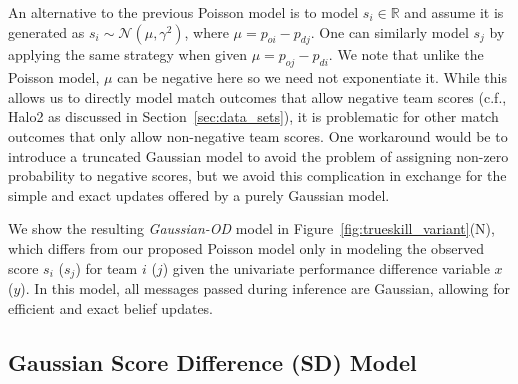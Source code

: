 \documentclass[runningheads,a4paper]{llncs}
\begin{document}
An alternative to the previous Poisson model is to
model $s_i \in \mathbb{R}$ and assume it
is generated as $s_{i}\sim \mathcal{N}(\mu, \gamma^2)$,
where $\mu = p_{oi}-p_{dj}$.  One can similarly
model $s_j$ by applying the same strategy when given $\mu = p_{oj} -
p_{di}$.  We note that unlike the Poisson model, $\mu$ can be negative
here so we need not exponentiate it.  While this allows us to directly
model match outcomes that allow negative team scores (c.f., Halo2 as
discussed in Section~\ref{sec:data_sets}), it is problematic for other
match outcomes that only allow non-negative team scores.  One
workaround would be to introduce a truncated Gaussian model to avoid
the problem of assigning non-zero probability to negative scores, but
we avoid this complication in exchange for the simple and exact
updates offered by a purely Gaussian model.

We show the resulting \emph{Gaussian-OD} model in
Figure~\ref{fig:trueskill_variant}(N), which
differs from our proposed Poisson model only in modeling the observed score $s_i$ ($s_j$) for team $i$ ($j$) given the univariate performance difference variable $x$ ($y$). In this model, all messages passed during inference
are Gaussian, allowing for efficient and exact belief updates.


\subsection{Gaussian Score Difference (SD) Model}
\end{document}
